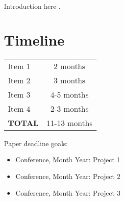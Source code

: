\documentclass{article}
\begin{document}

Introduction here \cite{SourceYear}.









\section{Timeline}

\begin{center}
\begin{tabular}{|l|c|}
\hline
Item 1 & 2 months \\
Item 2 & 3 months \\
Item 3 & 4-5 months \\
Item 4 & 2-3 months \\
\hline
\textbf{TOTAL} & 11-13 months \\
\hline
\end{tabular}
\end{center}

Paper deadline goals:

\begin{itemize}
\item Conference, Month Year: Project 1
\item Conference, Month Year: Project 2
\item Conference, Month Year: Project 3
\end{itemize}
\end{document}

